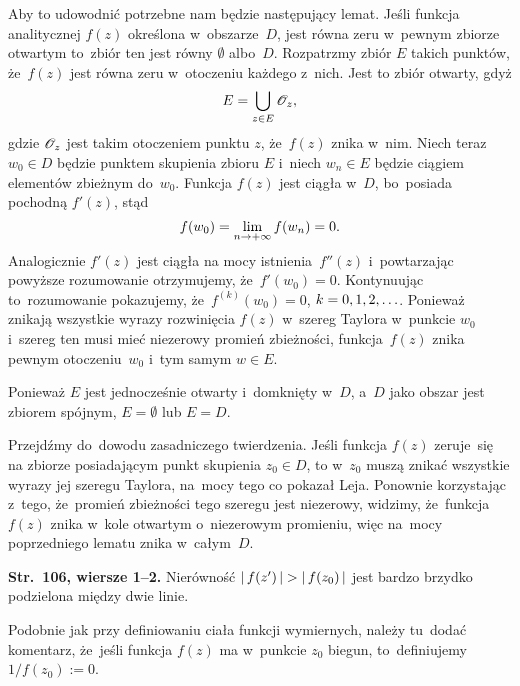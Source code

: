 \documentclass[a4paper,11pt]{article}
\begin{document}
Aby to udowodnić potrzebne nam będzie następujący lemat. Jeśli funkcja
analitycznej $f( z )$ określona w~obszarze~$D$, jest równa zeru
w~pewnym zbiorze otwartym to~zbiór ten jest równy $\emptyset$
albo~$D$. Rozpatrzmy zbiór $E$ takich punktów, że~$f( z )$ jest równa
zeru w~otoczeniu każdego z~nich. Jest to zbiór otwarty, gdyż
\begin{equation}
  \label{eq:Leja-37}
  E = \bigcup_{ z \in E } \mathcal{O}_{ z },
\end{equation}
gdzie $\mathcal{O}_{ z }$ jest takim otoczeniem punktu $z$, że~$f( z )$ znika
w~nim. Niech teraz $w_{ 0 } \in D$ będzie punktem skupienia zbioru $E$
i~niech $w_{ n } \in E$ będzie ciągiem elementów zbieżnym
do~$w_{ 0 }$. Funkcja $f( z )$ jest ciągła w~$D$, bo~posiada pochodną
$f'( z )$, stąd
\begin{equation}
  \label{eq:Leja-38}
  f( w_{ 0 } ) = \lim\limits_{ n \to +\infty } f( w_{ n } ) = 0.
\end{equation}
Analogicznie $f'( z )$ jest ciągła na mocy istnienia~$f''( z )$
i~powtarzając powyższe rozumowanie otrzymujemy,
że~$f'( w_{ 0 } ) = 0$. Kontynuując to~rozumowanie pokazujemy,
że~$f^{ ( k ) }( w_{ 0 } ) = 0$, $k = 0, 1, 2, \ldots$. Ponieważ znikają
wszystkie wyrazy rozwinięcia $f( z )$ w~szereg Taylora w~punkcie
$w_{ 0 }$ i~szereg ten musi mieć niezerowy promień zbieżności,
funkcja~$f( z )$ znika pewnym otoczeniu~$w_{ 0 }$ i~tym samym
$w \in E$.

Ponieważ $E$ jest jednocześnie otwarty i~domknięty w~$D$, a~$D$ jako
obszar jest zbiorem spójnym, $E = \emptyset$ lub $E = D$.

Przejdźmy do~dowodu zasadniczego twierdzenia. Jeśli funkcja $f( z )$
zeruje~się na zbiorze posiadającym punkt skupienia $z_{ 0 } \in D$, to
w~$z_{ 0 }$ muszą znikać wszystkie wyrazy jej szeregu Taylora, na~mocy
tego co pokazał Leja. Ponownie korzystając z~tego, że~promień
zbieżności tego szeregu jest niezerowy, widzimy, że~funkcja~$f( z )$
znika w~kole otwartym o~niezerowym promieniu, więc na~mocy
poprzedniego lematu znika w~całym~$D$.

\vspace{\spaceFour}


\start \textbf{Str.~106, wiersze 1--2.} Nierówność
$\left| \,  f( z' )  \, \right| > \left| \,  f( z_{ 0 } )  \, \right|$ jest bardzo brzydko
podzielona między dwie linie.

\vspace{\spaceFour}


\start {} Podobnie jak przy definiowaniu ciała funkcji
wymiernych, należy tu~dodać komentarz, że~jeśli funkcja $f( z )$ ma
w~punkcie $z_{ 0 }$ biegun, to~definiujemy $1 / f( z_{ 0 } ) := 0$.
\end{document}

